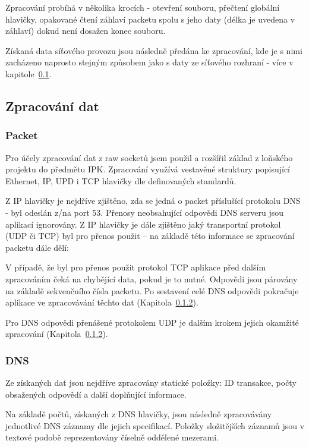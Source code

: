 \documentclass[11pt]{article}
\begin{document}
	Zpracování probíhá v několika krocích - otevření souboru, přečtení globální hlavičky, opakované čtení záhlaví packetu spolu s jeho daty (délka je uvedena v záhlaví) dokud není dosažen konec souboru.
	
	Získaná data síťového provozu jsou následně předána ke zpracování, kde je s nimi zacházeno naprosto stejným způsobem jako s daty ze síťového rozhraní - více v kapitole~\ref{section:data-processing}.

	\subsection{Zpracování dat} \label{section:data-processing}
	\subsubsection{Packet} \label{section:data-processing:packet}
	Pro účely zpracování dat z raw socketů jsem použil a rozšířil základ z loňského projektu do předmětu IPK. Zpracování využívá vestavěné struktury popisující Ethernet, IP\cite{RFC0791}, UPD\cite{RFC0768} i TCP\cite{RFC0793} hlavičky dle definovaných standardů.
	
	Z IP hlavičky je nejdříve zjištěno, zda se jedná o packet příslušící protokolu DNS - byl odeslán z/na port \textsf{53}\cite{RFC1035}. Přenosy neobsahující odpovědi DNS serveru jsou aplikací ignorovány. Z IP hlavičky je dále zjištěno jaký transportní protokol (UDP či TCP) byl pro přenos použit -- na základě této informace se zpracování packetu dále dělí:
	
	V případě, že byl pro přenos použit protokol TCP aplikace před dalším zpracováním čeká na chybějící data, pokud je to nutné\cite{RFC7766}. Odpovědi jsou párovány na základě sekvenčního čísla packetu\cite{RFC0793}. Po sestavení celé DNS odpovědi pokračuje aplikace ve zpracovávání těchto dat (Kapitola~\ref{section:data-processing:dns}).
	
	Pro DNS odpovědi přenášené protokolem UDP je dalším krokem jejich okamžité zpracování (Kapitola~\ref{section:data-processing:dns}).
	
	\subsubsection{DNS} \label{section:data-processing:dns}
	Ze získaných dat jsou nejdříve zpracovány statické položky: ID transakce, počty obsažených odpovědí a další doplňující informace\cite{RFC1035}.
	
	Na základě počtů, získaných z DNS hlavičky, jsou následně zpracovávány jednotlivé DNS záznamy dle jejich specifikací\cite{RFC1035}\cite{RFC4034}. Položky složitějších záznamů jsou v textové podobě reprezentovány číselně oddělené mezerami.
	
\end{document}
